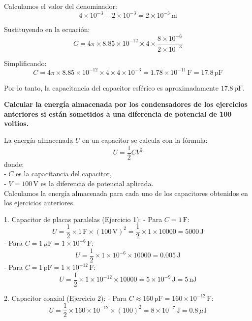 \documentclass[answers]{exam} %
\begin{document}
\begin{questions}
        Calculamos el valor del denominador:
        \[
        4 \times 10^{-3} - 2 \times 10^{-3} = 2 \times 10^{-3} \, \text{m}
        \]
        
        Sustituyendo en la ecuación:
        \[
        C = 4 \pi \times 8.85 \times 10^{-12} \times 4 \times \frac{8 \times 10^{-6}}{2 \times 10^{-3}}
        \]
        
        Simplificando:
        \[
        C = 4 \pi \times 8.85 \times 10^{-12} \times 4 \times 4 \times 10^{-3} = 1.78 \times 10^{-11} \, \text{F} = 17.8 \, \text{pF}
        \]
        
        Por lo tanto, la capacitancia del capacitor esférico es aproximadamente \( 17.8 \, \text{pF} \).
      
        
     \vspace{0.5cm}
    \question \large\textbf{Calcular la energía almacenada por los condensadores de los ejercicios anteriores si están sometidos a una diferencia de potencial de 100 voltios.}

  
        La energía almacenada \( U \) en un capacitor se calcula con la fórmula:
        \[
        U = \frac{1}{2} C V^2
        \]
        donde:\\
        - \( C \) es la capacitancia del capacitor,\\
        - \( V = 100 \, \text{V} \) es la diferencia de potencial aplicada.\\
        
        Calculamos la energía almacenada para cada uno de los capacitores obtenidos en los ejercicios anteriores.
        
        1. Capacitor de placas paralelas (Ejercicio 1):
           - Para \( C = 1 \, \text{F} \):
             \[
             U = \frac{1}{2} \times 1 \, \text{F} \times (100 \, \text{V})^2 = \frac{1}{2} \times 1 \times 10000 = 5000 \, \text{J}
             \]
           - Para \( C = 1 \, \mu \text{F} = 1 \times 10^{-6} \, \text{F} \):
             \[
             U = \frac{1}{2} \times 1 \times 10^{-6} \times 10000 = 0.005 \, \text{J}
             \]
           - Para \( C = 1 \, \text{pF} = 1 \times 10^{-12} \, \text{F} \):
             \[
             U = \frac{1}{2} \times 1 \times 10^{-12} \times 10000 = 5 \times 10^{-9} \, \text{J} = 5 \, \text{nJ}
             \]
        
        2. Capacitor coaxial (Ejercicio 2):
           - Para \( C \approx 160 \, \text{pF} = 160 \times 10^{-12} \, \text{F} \):
             \[
             U = \frac{1}{2} \times 160 \times 10^{-12} \times (100)^2 = 8 \times 10^{-7} \, \text{J} = 0.8 \, \mu \text{J}
             \]
        

\end{questions}
\end{document}
